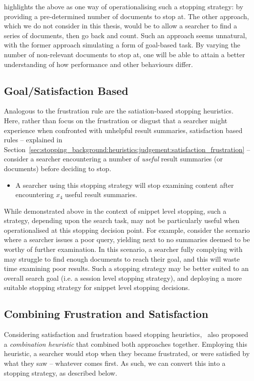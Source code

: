 \cite{cooper1973retrieval_effectiveness_ii} highlights the above as one way of operationalising such a stopping strategy: by providing a pre-determined number of documents to stop at. The other approach, which we do not consider in this thesis, would be to allow a searcher to find a series of documents, then go back and count. Such an approach seems unnatural, with the former approach simulating a form of goal-based task. By varying the number of non-relevant documents to stop at, one will be able to attain a better understanding of how performance and other behaviours differ.

\subsection{Goal/Satisfaction Based}
Analogous to the frustration rule are the satiation-based stopping heuristics. Here, rather than focus on the frustration or disgust that a searcher might experience when confronted with unhelpful result summaries, satisfaction based rules -- explained in Section~\ref{sec:stopping_background:heuristics:judgement:satisfaction_frustration} -- consider a searcher encountering a number of \emph{useful} result summaries (or documents) before deciding to stop.

\begin{itemize}
    \item[\blueboxbold{SS4}] A searcher using this stopping strategy will stop examining content after encountering $x_4$ useful result summaries.
\end{itemize}

While demonstrated above in the context of snippet level stopping, such a strategy, depending upon the search task, may not be particularly useful when operationalised at this stopping decision point. For example, consider the scenario where a searcher issues a poor query, yielding next to no summaries deemed to be worthy of further examination. In this scenario, a searcher fully complying with  may struggle to find enough documents to reach their goal, and this will waste time examining poor results. Such a stopping strategy may be better suited to an overall search goal (i.e. a session level stopping strategy), and deploying a more suitable stopping strategy for snippet level stopping decisions.


\subsection{Combining Frustration and Satisfaction}
Considering satisfaction and frustration based stopping heuristics,~\citealt{kraft1979stopping_rules} also proposed a \emph{combination heuristic} that combined both approaches together. Employing this heuristic, a searcher would stop when they became frustrated, or were satisfied by what they saw -- whatever comes first. As such, we can convert this into a stopping strategy, as described below.

